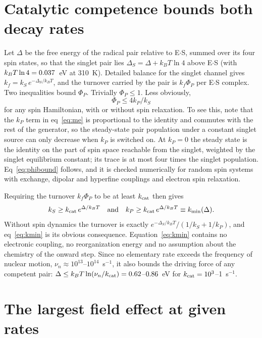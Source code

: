 \documentclass[journal=jpcbfk,manuscript=article,layout=traditional]{achemso}
\begin{document}
\section{Catalytic competence bounds both decay rates}

Let $\Delta$ be the free energy of the radical pair relative to E$\cdot$S,
summed over its four spin states, so that the singlet pair lies
$\Delta_S = \Delta + k_BT\ln 4$ above E$\cdot$S (with $k_BT\ln4 = 0.037$~eV at
310~K). Detailed balance for the singlet channel gives
$k_f = k_S\,e^{-\Delta_S/k_BT}$, and the turnover carried by the pair is
$k_f\Phi_P$ per E$\cdot$S complex. Two inequalities bound $\Phi_P$. Trivially
$\Phi_P\le1$. Less obviously,
\begin{equation}
\Phi_P \le 4k_P/k_S
\label{eq:phibound}
\end{equation}
for any spin Hamiltonian, with or without spin relaxation. To see this, note
that the $k_P$ term in eq~\ref{eq:me} is proportional to the identity and
commutes with the rest of the generator, so the steady-state pair population
under a constant singlet source can only decrease when $k_P$ is switched on. At
$k_P=0$ the steady state is the identity on the part of spin space reachable
from the singlet, weighted by the singlet equilibrium constant; its trace is at
most four times the singlet population. Eq~\ref{eq:phibound} follows, and it is
checked numerically for random spin systems with exchange, dipolar and
hyperfine couplings and electron spin relaxation.

Requiring the turnover $k_f\Phi_P$ to be at least $k_{\rm cat}$ then gives
\begin{equation}
k_S \ge k_{\rm cat}\,e^{\Delta/k_BT}\quad\text{and}\quad
k_P \ge k_{\rm cat}\,e^{\Delta/k_BT} \equiv k_{\min}(\Delta).
\label{eq:kmin}
\end{equation}
Without spin dynamics the turnover is exactly
$e^{-\Delta_S/k_BT}/(1/k_S+1/k_P)$, and eq~\ref{eq:kmin} is its obvious
consequence. Equation~\ref{eq:kmin} contains no electronic coupling, no
reorganization energy and no assumption about the chemistry of the onward
step. Since no elementary rate exceeds the frequency of nuclear motion,
$\nu_n\approx10^{13}$--$10^{14}$~s$^{-1}$, it also bounds the driving force of
any competent pair:
$\Delta\le k_BT\ln(\nu_n/k_{\rm cat}) = 0.62$--$0.86$~eV for
$k_{\rm cat}=10^3$--1~s$^{-1}$.

\section{The largest field effect at given rates}
\label{sec:map}
\end{document}
